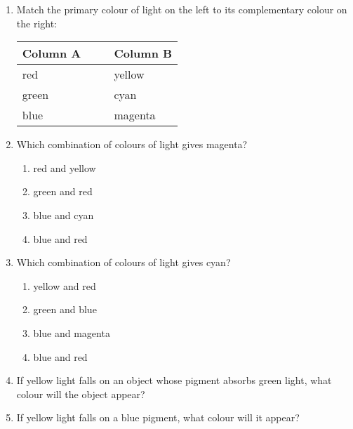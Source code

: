 \begin{enumerate}
\item{
Match the primary colour of light on the left to its complementary colour on the right:
\begin{center}
\begin{tabular}{ll}
\textbf{Column A} & \textbf{Column B} \\ \hline
red   \ \ \ & yellow \\
green \ \ \ \ \ \ \ \ \ & cyan \\
blue  \ \ \ & magenta \\
\end{tabular}
\end{center}
} 

\item{
Which combination of colours of light gives magenta?
\renewcommand{\labelenumii}{\Alph{enumii}}
\begin{enumerate}
\item red and yellow
\item green and red
\item blue and cyan
\item blue and red
\end{enumerate}
}

\item{
Which combination of colours of light gives cyan?
\renewcommand{\labelenumii}{\Alph{enumii}}
\begin{enumerate}
\item yellow and red
\item green and blue
\item blue and magenta
\item blue and red
\end{enumerate}
}

\item{If yellow light falls on an object whose pigment absorbs green light, what colour will the object appear?}

\item{If yellow light falls on a blue pigment, what colour will it appear?}

\end{enumerate}





